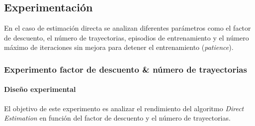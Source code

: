 \subsection{Experimentación}

En el caso de estimación directa se analizan diferentes parámetros como el factor de descuento, el número de trayectorias, episodios de entrenamiento y el número máximo de iteraciones sin mejora para detener el entrenamiento (\textit{patience}).

\subsubsection{Experimento factor de descuento \& número de trayectorias}

\paragraph{Diseño experimental}

El objetivo de este experimento es analizar el rendimiento del algoritmo \textit{Direct Estimation} en función del factor de descuento y el número de trayectorias.

